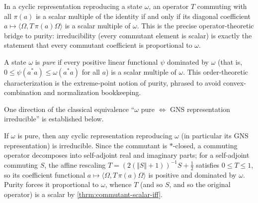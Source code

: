 \begin{theorem}
    \label{thrm:commutant-scalar-iff}
    \leanok
    In a cyclic representation reproducing a state $\omega$, an operator $T$ commuting with all $\pi(a)$ is a scalar multiple of the identity if and only if its diagonal coefficient $a \mapsto \langle \Omega, T\,\pi(a)\Omega\rangle$ is a scalar multiple of $\omega$. This is the precise operator-theoretic bridge to purity: irreducibility (every commutant element is scalar) is exactly the statement that every commutant coefficient is proportional to $\omega$.
\end{theorem}

\begin{definition}
    \label{def:pure-state}
    \leanok
    A state $\omega$ is \emph{pure} if every positive linear functional $\psi$ dominated by $\omega$ (that is, $0 \le \psi(a^*a) \le \omega(a^*a)$ for all $a$) is a scalar multiple of $\omega$. This order-theoretic characterization is the extreme-point notion of purity, phrased to avoid convex-combination and normalization bookkeeping.
\end{definition}

One direction of the classical equivalence ``$\omega$ pure $\iff$ GNS representation irreducible'' is established below.

\begin{theorem}
    \label{thrm:pure-implies-irreducible}
    \leanok
    If $\omega$ is pure, then any cyclic representation reproducing $\omega$ (in particular its GNS representation) is irreducible. Since the commutant is $*$-closed, a commuting operator decomposes into self-adjoint real and imaginary parts; for a self-adjoint commuting $S$, the affine rescaling $T = (2(\Vert S\Vert+1))^{-1} S + \tfrac12$ satisfies $0 \le T \le 1$, so its coefficient functional $a \mapsto \langle \Omega, T\,\pi(a)\Omega\rangle$ is positive and dominated by $\omega$. Purity forces it proportional to $\omega$, whence $T$ (and so $S$, and so the original operator) is a scalar by \ref{thrm:commutant-scalar-iff}.
\end{theorem}

